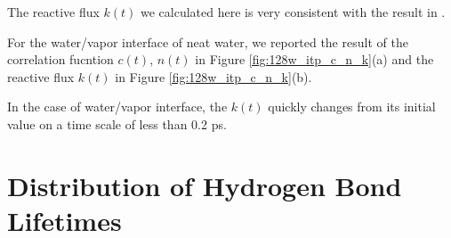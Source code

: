 The reactive flux $k(t)$ we calculated here is very consistent with the result in \cite{AL96b}.

For the water/vapor interface of neat water, we reported the result of the correlation fucntion  $c(t)$, $n(t)$
in Figure \ref{fig:128w_itp_c_n_k}(a) and the reactive flux $k(t)$ in Figure \ref{fig:128w_itp_c_n_k}(b).
 
%
In the case of water/vapor interface, the $k(t)$ quickly changes from its initial value on a time scale of less than 0.2 ps.
%
\FloatBarrier
\section{Distribution of Hydrogen Bond Lifetimes}
